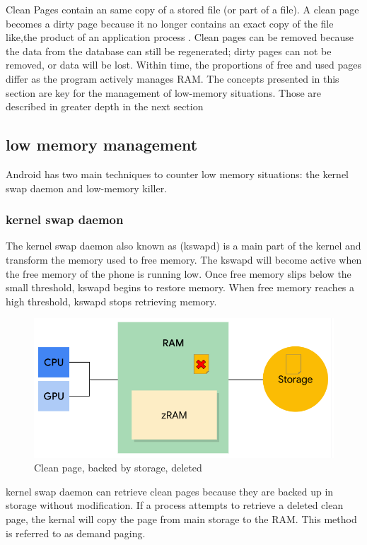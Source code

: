 \documentclass[preprint,12pt]{elsarticle}
\begin{document}
Clean Pages contain an same copy of a stored file (or part of a file). A clean page becomes a dirty page because it no longer contains an exact copy of the file like,the product of an application process . Clean pages can be removed because the data from the database can still be regenerated; dirty pages can not be removed, or data will be lost. 
Within time, the proportions of free and used pages differ as the program actively manages RAM. The concepts presented in this section are key for the management of low-memory situations. Those are described in greater depth in the next section \cite{9}

\subsection{low memory management}

Android has two main techniques to counter low memory situations: the kernel swap daemon and low-memory killer.

 \subsubsection{kernel swap daemon} 
The kernel swap daemon also known as (kswapd) is a main part of the kernel and transform the memory used to free memory. The kswapd will become active when the free memory of the phone is running low. Once free memory slips below the small threshold, kswapd begins to restore memory. When free memory reaches a high threshold, kswapd stops retrieving memory.

\begin{figure}[h]
    \centering
    \includegraphics[scale=0.4]{ram1.png}
    \caption{Clean page, backed by storage, deleted}
    \label{fig:mesh1}
\end{figure} 

kernel swap daemon can retrieve clean pages because they are backed up in storage without modification. If a process attempts to retrieve a deleted clean page, the kernal will copy the page from main storage to the RAM. This method is referred to as demand paging.
\end{document}
